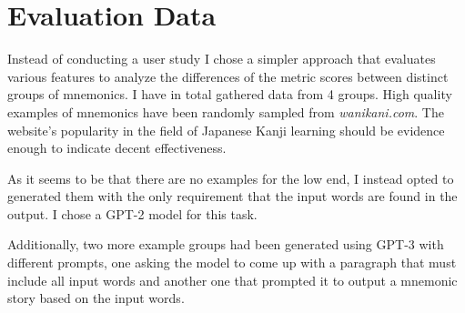 \section{Evaluation Data} \label{sec:body_evaluation_data}

Instead of conducting a user study I chose a simpler approach that evaluates various features to analyze the differences of the metric scores between distinct groups of mnemonics. I have in total gathered data from 4 groups. High quality examples of mnemonics have been randomly sampled from  \emph{wanikani.com}. The website's popularity in the field of Japanese Kanji learning should be evidence enough to indicate decent effectiveness.

As it seems to be that there are no examples for the low end, I instead opted to generated them with the only requirement that the input words are found in the output. I chose a GPT-2 model for this task.

Additionally, two more example groups had been generated using GPT-3 with different prompts, one asking the model to come up with a paragraph that must include all input words and another one that prompted it to output a mnemonic story based on the input words.

